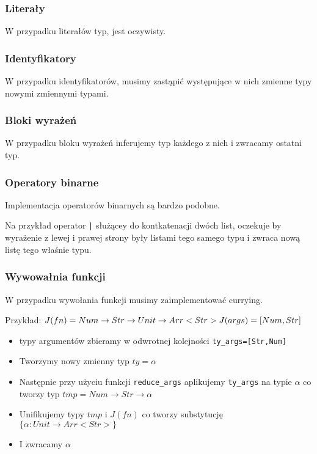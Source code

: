 \documentclass{article}
\begin{document}
\subsubsection{Literały}
W przypadku literałów typ, jest oczywisty.

\subsubsection{Identyfikatory}
W przypadku identyfikatorów, musimy zastąpić występujące w nich zmienne typy nowymi zmiennymi typami.

\subsubsection{Bloki wyrażeń}
W przypadku bloku wyrażeń inferujemy typ każdego z nich i zwracamy ostatni typ.


\subsubsection{Operatory binarne}
Implementacja operatorów binarnych są bardzo podobne.

Na przykład operator \lstinline{|} służącey do kontkatenacji dwóch list, oczekuje by wyrażenie z lewej i prawej strony były listami tego samego typu i zwraca nową listę tego właśnie typu.\newpage

\subsubsection{Wywowałnia funkcji}
W przypadku wywołania funkcji musimy zaimplementować currying.

Przykład: $J(fn)=Num\rightarrow Str\rightarrow Unit\rightarrow Arr<Str>\\ J(args)=[Num,Str]$
\begin{itemize}
  \item typy argumentów zbieramy w odwrotnej kolejności \lstinline{ty_args=[Str,Num]}
  \item Tworzymy nowy zmienny typ $ty=\alpha$
  \item Następnie przy użyciu funkcji \lstinline{reduce_args} aplikujemy \lstinline{ty_args} na typie $\alpha$ co tworzy typ $tmp=Num\rightarrow Str\rightarrow \alpha$
  \item Unifikujemy typy $tmp$ i $J(fn)$ co tworzy substytucję $\{\alpha: Unit\rightarrow Arr<Str>\}$
  \item I zwracamy $\alpha$
\end{itemize}

\end{document}
